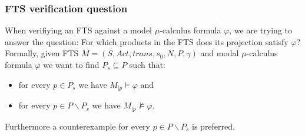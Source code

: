\subsubsection{FTS verification question}
When verifiying an FTS against a model $\mu$-calculus formula $\varphi$, we are trying to answer the question: For which products in the FTS does its projection satisfy $\varphi$? Formally, given FTS $M = (S, Act, trans, s_0, N, P, \gamma)$ and modal $\mu$-calculus formula $\varphi$ we want to find $P_s \subseteq P$ such that:
\begin{itemize}
	\item for every $p \in P_s$ we have $M_{|p} \models \varphi$ and
	\item for every $p \in P \backslash P_s$ we have $M_{|p} \not\models \varphi$.
\end{itemize}
Furthermore a counterexample for every $p \in P \backslash P_s$ is preferred.